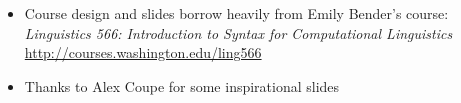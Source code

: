\documentclass[a4paper,landscape,headrule,footrule]{foils}
\begin{document}

\begin{itemize}
\item Course design and slides borrow heavily from Emily Bender's course:
\textit{Linguistics 566: Introduction to Syntax for Computational Linguistics}
\\ \url{http://courses.washington.edu/ling566}
\item Thanks to Alex Coupe for some inspirational slides
\end{itemize}



\end{document}
